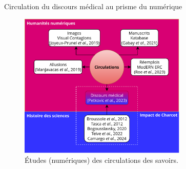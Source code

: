 \begin{frame}{Circulation du discours médical au prisme du numérique}
\begin{figure}
    \centering
    \includegraphics[width=80mm,scale=0.5]{pic/dh_histoire-sciences.png}
    \caption{Études (numériques) des circulations des savoirs.}
    \label{fig:enter-label}
\end{figure}
\nocite{joyeux2019visual}
\nocite{gabay2021katabase}
\nocite{manjavacas2019}
\nocite{bogousslavsky}
\nocite{camargo}
\nocite{}
\end{frame}

